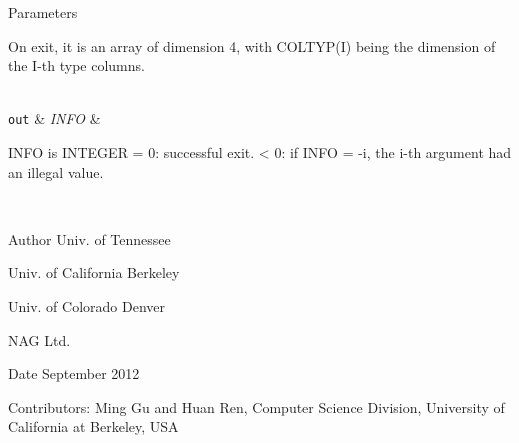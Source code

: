 \begin{DoxyParams}[1]{Parameters}
\begin{DoxyVerb}
         On exit, it is an array of dimension 4, with COLTYP(I) being
         the dimension of the I-th type columns.\end{DoxyVerb}
\\
\hline
\mbox{\tt out}  & {\em I\+N\+F\+O} & \begin{DoxyVerb}          INFO is INTEGER
          = 0:  successful exit.
          < 0:  if INFO = -i, the i-th argument had an illegal value.\end{DoxyVerb}
 \\
\hline
\end{DoxyParams}
\begin{DoxyAuthor}{Author}
Univ. of Tennessee 

Univ. of California Berkeley 

Univ. of Colorado Denver 

N\+A\+G Ltd. 
\end{DoxyAuthor}
\begin{DoxyDate}{Date}
September 2012 
\end{DoxyDate}
\begin{DoxyParagraph}{Contributors\+: }
Ming Gu and Huan Ren, Computer Science Division, University of California at Berkeley, U\+S\+A 
\end{DoxyParagraph}
\hypertarget{group__auxOTHERauxiliary_ga791d0eee86fc85a3e132e613c55d1d56}{}
